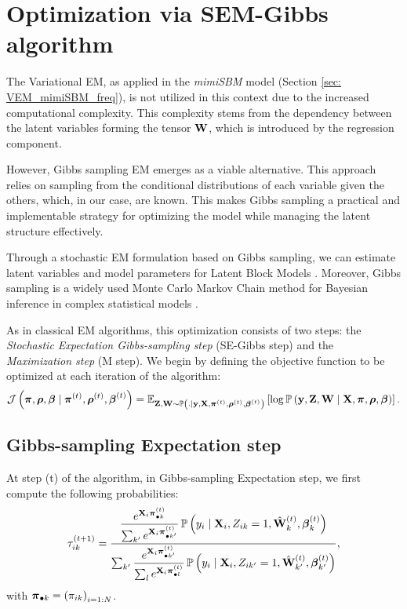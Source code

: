 \section{Optimization via SEM-Gibbs algorithm}

The Variational EM, as applied in the \textit{mimiSBM} model (Section \ref{sec: VEM_mimiSBM_freq}), is not utilized in this context due to the increased computational complexity. This complexity stems from the dependency between the latent variables forming the tensor $\mathbf{W}$, which is introduced by the regression component.

However, Gibbs sampling EM emerges as a viable alternative. This approach relies on sampling from the conditional distributions of each variable given the others, which, in our case, are known. This makes Gibbs sampling a practical and implementable strategy for optimizing the model while managing the latent structure effectively.

Through a stochastic EM formulation based on Gibbs sampling, we can estimate latent variables and model parameters for Latent Block Models \citep{keribin2012model}. Moreover, Gibbs sampling is a widely used Monte Carlo Markov Chain method for Bayesian inference in complex statistical models \citep{gelfand1990illustration, yildirim2012bayesian, tobin2024co}. 

As in classical EM algorithms, this optimization consists of two steps: the \textit{ Stochastic Expectation Gibbs-sampling step} (SE-Gibbs step) and the \textit{Maximization step} (M step).
%
We begin by defining the objective function to be optimized at each iteration of the algorithm:
\begin{equation}
    \mathcal{J}\left(\boldsymbol{\pi}, \boldsymbol{\rho}, \boldsymbol{\beta} \mid \boldsymbol{\pi}^{(t)}, \boldsymbol{\rho}^{(t)}, \boldsymbol{\beta}^{(t)} \right) = \mathbb{E}_{\mathbf{Z},\mathbf{W} \sim \operatorname{\mathbb{P}}\left(. \mid \mathbf{y}, \mathbf{X}, \boldsymbol{\pi}^{(t)}, \boldsymbol{\rho}^{(t)}, \boldsymbol{\beta}^{(t)} \right)} \left[ \log \operatorname{\mathbb{P}} \left(\mathbf{y},\mathbf{Z},\mathbf{W} \mid \mathbf{X}, \boldsymbol{\pi}, \boldsymbol{\rho}, \boldsymbol{\beta}  \right)\right].
\end{equation}


\subsection{Gibbs-sampling Expectation step}
At step (t) of the algorithm, in Gibbs-sampling Expectation step, we first compute the following probabilities:
\begin{equation}
    \tau_{ik}^{(t+1)} = \dfrac{\dfrac{e^{\mathbf{X}_i \boldsymbol{\pi}^{(t)}_{\bullet k}}}{\sum_{k'} e^{\mathbf{X}_i \boldsymbol{\pi}^{(t)}_{\bullet k'}}} \operatorname{\mathbb{P}}\left( y_i \mid \mathbf{X}_i, Z_{ik}=1,\hat{\mathbf{W}}^{(t)}_{k }, \boldsymbol{\beta}^{(t)}_k\right) }
    {\sum_{k'} \dfrac{e^{\mathbf{X}_i \boldsymbol{\pi}^{(t)}_{\bullet k'}}}{\sum_{l} e^{\mathbf{X}_i \boldsymbol{\pi}^{(t)}_{\bullet l}}} \operatorname{\mathbb{P}}\left( y_i \mid \mathbf{X}_i,Z_{ik'}=1,\hat{\mathbf{W}}^{(t)}_{k' }, \boldsymbol{\beta}^{(t)}_{k'}\right)},
\label{eq: MoEBIUS_tau}
\end{equation}
with $\boldsymbol{\pi}_{\bullet k} = \left( \pi_{ik} \right)_{i=1:N}$.

